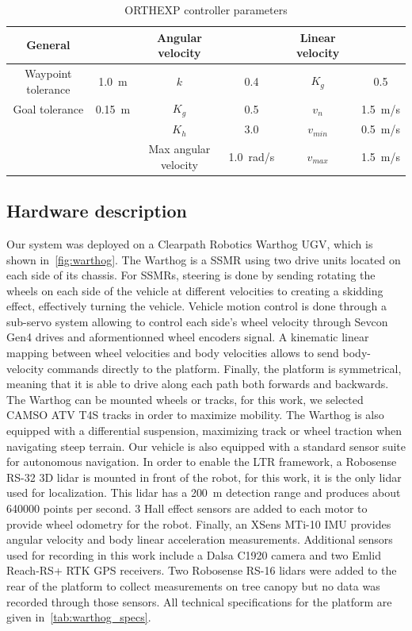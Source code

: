 \begin{table}[htpb]
	\caption{\ac{ORTHEXP} controller parameters} \label{tab:orthexp_params}
	\begin{center}
		\begin{tabular}{c c c c c c}
			General & & Angular velocity & & Linear velocity \\
			\hline
			Waypoint tolerance & \SI{1.0}{m} & $k$ & 0.4 & $K_g$ & 0.5 \\
			Goal tolerance & \SI{0.15}{m} & $K_g$ & 0.5 & $v_n$ & \SI{1.5}{m/s} \\
			 & & $K_h$ & 3.0 & $v_{min}$ & \SI{0.5}{m/s} \\
			 & & Max angular velocity & \SI{1.0}{rad/s} & $v_{max}$ & \SI{1.5}{m/s} \\
		\end{tabular}
	\end{center}
\end{table}

\subsection{Hardware description}
\label{sec:hardware}

Our system was deployed on a Clearpath Robotics Warthog \ac{UGV}, which is shown in~\autoref{fig:warthog}. 
The Warthog is a \ac{SSMR} using two drive units located on each side of its chassis. 
For \acp{SSMR}, steering is done by sending rotating the wheels on each side of the vehicle at different velocities to creating a skidding effect, effectively turning the vehicle.
Vehicle motion control is done through a sub-servo system allowing to control each side's wheel velocity through Sevcon Gen4 drives and aformentionned wheel encoders signal.
A kinematic linear mapping between wheel velocities and body velocities allows to send body-velocity commands directly to the platform.
Finally, the platform is symmetrical, meaning that it is able to drive along each path both forwards and backwards.
The Warthog can be mounted wheels or tracks, for this work, we selected CAMSO ATV T4S tracks in order to maximize mobility. 
The Warthog is also equipped with a differential suspension, maximizing track or wheel traction when navigating steep terrain.
Our vehicle is also equipped with a standard sensor suite for autonomous navigation. 
In order to enable the \ac{LTR} framework, a Robosense RS-32 3D lidar is mounted in front of the robot, for this work, it is the only lidar used for localization.
This lidar has a \SI{200}{m} detection range and produces about \SI{640000}{} points per second.
3 Hall effect sensors are added to each motor to provide wheel odometry for the robot. 
Finally, an XSens MTi-10 \ac{IMU} provides angular velocity and body linear acceleration measurements. 
Additional sensors used for recording in this work include a Dalsa C1920 camera and two Emlid Reach-RS+ \ac {RTK} \ac{GPS} receivers.
Two Robosense RS-16 lidars were added to the rear of the platform to collect measurements on tree canopy but no data was recorded through those sensors. 
All technical specifications for the platform are given in~\autoref{tab:warthog_specs}.


